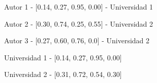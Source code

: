\begin{description}
 \item[Autor - Topic Profile - Universidad]
 \item Autor 1 - $[$0.14, 0.27, 0.95, 0.00$]$ - Universidad 1
 \item Autor 2 - $[$0.30, 0.74, 0.25, 0.55$]$ - Universidad 2
 \item Autor 3 - $[$0.27, 0.60, 0.76, 0.0$]$ - Universidad 2
\end{description}

\begin{description}
 \item[Universidad - Topic Profile]
 \item Universidad 1 - $[$0.14, 0.27, 0.95, 0.00$]$
 \item Universidad 2 - $[$0.31, 0.72, 0.54, 0.30$]$
\end{description}